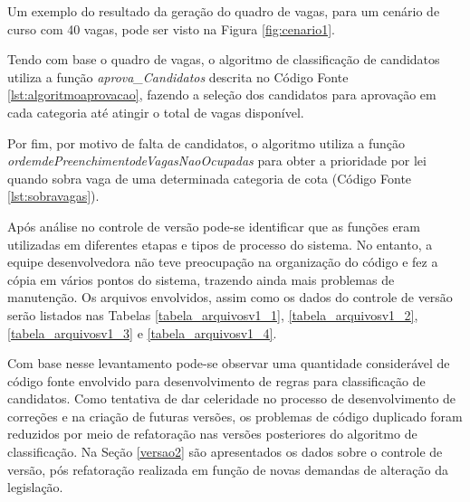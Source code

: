 Um exemplo do resultado da geração do quadro de vagas, para um cenário de curso com 40 vagas,  pode ser visto na Figura \ref{fig:cenario1}.



\newpage
Tendo com base o quadro de vagas, o algoritmo de classificação de candidatos utiliza a função \textit{aprova\_Candidatos} descrita no Código Fonte \ref{lst:algoritmoaprovacao}, fazendo a seleção dos candidatos para aprovação em cada categoria até atingir o total de vagas disponível. 



Por fim, por motivo de falta de candidatos, o algoritmo utiliza a função \textit{ordemdePreenchimentodeVagasNaoOcupadas} para obter a prioridade por lei quando sobra vaga de uma determinada categoria de cota (Código Fonte \ref{lst:sobravagas}).



Após análise no controle de versão pode-se identificar que as funções eram utilizadas em diferentes etapas e tipos de processo do sistema. No entanto, a equipe desenvolvedora não teve preocupação na organização do código e fez a cópia em vários pontos do sistema, trazendo ainda mais problemas de manutenção. Os arquivos envolvidos, assim como os dados do controle de versão serão listados nas Tabelas \ref{tabela_arquivosv1_1}, \ref{tabela_arquivosv1_2}, \ref{tabela_arquivosv1_3} e \ref{tabela_arquivosv1_4}.



\newpage
Com base nesse levantamento pode-se observar uma quantidade considerável de código fonte envolvido para desenvolvimento de regras para classificação de candidatos. Como tentativa de dar celeridade no processo de desenvolvimento de correções e na criação de futuras versões, os problemas de código duplicado foram reduzidos por meio de refatoração nas versões posteriores do algoritmo de classificação. Na Seção \ref{versao2} são apresentados os dados sobre o controle de versão, pós refatoração realizada em função de novas demandas de alteração da legislação.
